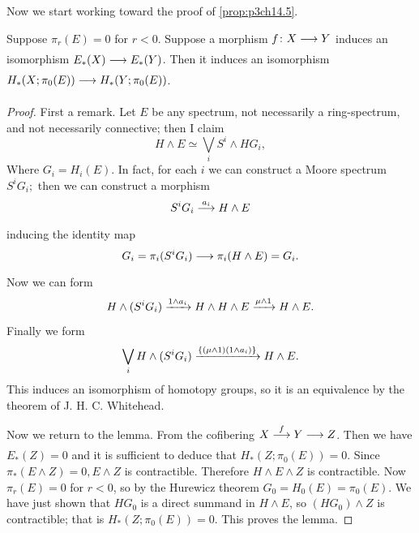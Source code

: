 \documentclass[../main]{subfiles}
\begin{document}
Now we start working toward the proof of \ref{prop:p3ch14.5}.

\begin{lemma} \label{lem:p3ch14.12}
Suppose $\pi_{r}(E)=0$ for $r<0$. Suppose a morphism $f\colon X \lar{} Y$ induces an isomorphism $E_{\ast}(X) \lar{} E_{\ast}(Y)$. Then it induces an isomorphism $H_{\ast}(X;\pi_{0}(E)) \lar{} H_{\ast}(Y;\pi_{0}(E))$.
\begin{proof} 
    First a remark. Let $E$ be any spectrum, not necessarily a ring-spectrum, and not necessarily connective; then I claim
    \[
      H \wedge E \simeq \bigvee_{i} S^i \wedge HG_i, 
    \] 
    Where $G_{i} = H_{i}(E)$. In fact, for each $i$ we can construct a Moore spectrum $S^iG_{i};$ then we can construct a morphism
    \[
      S^iG_{i} \vra{a_{i}} H \wedge E 
    \] 
    inducing the identity map
    \[
      G_{i} = \pi_{i}(S^iG_{i}) \lar{} \pi_{i}(H \wedge E)= G_{i}.
    \] 
    Now we can form 
    \[
      H \wedge (S^iG_i) \vra{1 \wedge a_{i}} H \wedge H \wedge E \vra{\mu \wedge 1} H \wedge E.  
    \] 
    Finally we form 
    \[
      \bigvee_{i} H \wedge (S^iG_{i}) \vra{\{(\mu \wedge 1) (1 \wedge a_{i})\} } H \wedge E.
    \] 
    This induces an isomorphism of homotopy groups, so it is an equivalence by the theorem of J. H. C. Whitehead.

    Now we return to the lemma. From the cofibering $X\vra{f} Y \lar{} Z$. Then we have $E_{\ast}(Z)=0$ and it is sufficient to deduce that $H_{\ast}(Z;\pi_{0}(E))=0$. Since $ \pi_{\ast}(E \wedge Z)=0, E \wedge Z$ is contractible. Therefore $H \wedge E \wedge Z$ is contractible. Now $ \pi_{r}(E)=0$ for $r<0$, so by the Hurewicz theorem $ G_0 = H_0(E) = \pi_{0}(E)$. We have just shown that $HG_0$ is a direct summand in $H \wedge E$, so $(HG_0) \wedge Z$ is contractible; that is $H_{\ast}(Z; \pi_{0}(E))=0$. This proves the lemma.
\end{proof}

\end{lemma}
\end{document}
